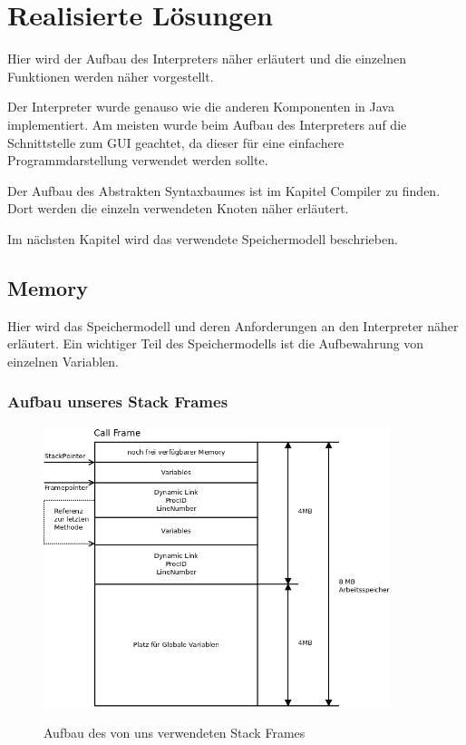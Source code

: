 \section{Realisierte Lösungen}
Hier wird der Aufbau des Interpreters näher erläutert und die einzelnen Funktionen werden näher vorgestellt.

Der Interpreter wurde genauso wie die anderen Komponenten in Java implementiert.
Am meisten wurde beim Aufbau des Interpreters auf die Schnittstelle zum GUI geachtet, da dieser für eine einfachere
Programmdarstellung verwendet werden sollte.

Der Aufbau des Abstrakten Syntaxbaumes ist im Kapitel Compiler zu finden. Dort werden die einzeln verwendeten 
Knoten näher erläutert.

Im nächsten Kapitel wird das verwendete Speichermodell beschrieben.

\subsection{Memory}
Hier wird das Speichermodell und deren Anforderungen an den Interpreter näher erläutert.
Ein wichtiger Teil des Speichermodells ist die Aufbewahrung von einzelnen Variablen.

\subsubsection{Aufbau unseres Stack Frames}
\begin{figure}[Stack Frame]
\begin{center}
\includegraphics[width=0.9\textwidth]{./media/images/interpreter/memory/stackframe.png}
\label{fig:stackframe1} 
\caption{Aufbau des von uns verwendeten Stack Frames}
\end{center}
\end{figure}

